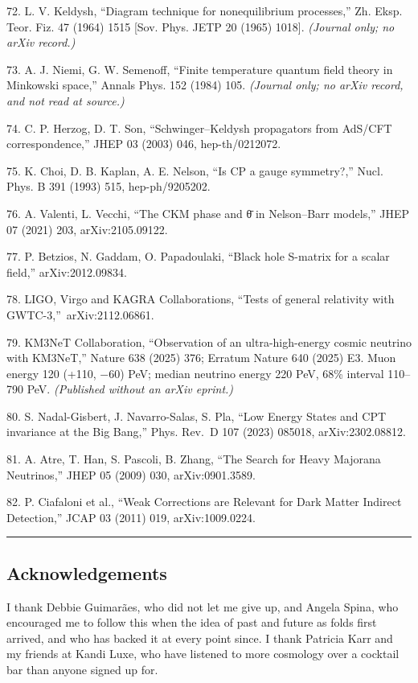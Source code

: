 \documentclass[
]{article}
\newcounter{none} %
\begin{document}
72. L. V. Keldysh, ``Diagram technique for nonequilibrium processes,''
Zh. Eksp. Teor. Fiz. 47 (1964) 1515 {[}Sov. Phys. JETP 20 (1965)
1018{]}. \emph{(Journal only; no arXiv record.)}

73. A. J. Niemi, G. W. Semenoff, ``Finite temperature quantum field
theory in Minkowski space,'' Annals Phys. 152 (1984) 105. \emph{(Journal
only; no arXiv record, and not read at source.)}

74. C. P. Herzog, D. T. Son, ``Schwinger--Keldysh propagators from
AdS/CFT correspondence,'' JHEP 03 (2003) 046, hep-th/0212072.

75. K. Choi, D. B. Kaplan, A. E. Nelson, ``Is CP a gauge symmetry?,''
Nucl. Phys. B 391 (1993) 515, hep-ph/9205202.

76. A. Valenti, L. Vecchi, ``The CKM phase and θ̄ in Nelson--Barr
models,'' JHEP 07 (2021) 203, arXiv:2105.09122.

77. P. Betzios, N. Gaddam, O. Papadoulaki, ``Black hole S-matrix for a
scalar field,'' arXiv:2012.09834.

78. LIGO, Virgo and KAGRA Collaborations, ``Tests of general relativity
with GWTC-3,''~arXiv:2112.06861.

79. KM3NeT Collaboration, ``Observation of an ultra-high-energy cosmic
neutrino with KM3NeT,'' Nature 638 (2025) 376; Erratum Nature 640 (2025)
E3. Muon energy 120 (+110, −60) PeV; median neutrino energy 220 PeV,
68\% interval 110--790 PeV. \emph{(Published without an arXiv eprint.)}

80. S. Nadal-Gisbert, J. Navarro-Salas, S. Pla, ``Low Energy States and
CPT invariance at the Big Bang,'' Phys. Rev.~D 107 (2023) 085018,
arXiv:2302.08812.

81. A. Atre, T. Han, S. Pascoli, B. Zhang, ``The Search for Heavy
Majorana Neutrinos,'' JHEP 05 (2009) 030, arXiv:0901.3589.

82. P. Ciafaloni et al., ``Weak Corrections are Relevant for Dark Matter
Indirect Detection,'' JCAP 03 (2011) 019, arXiv:1009.0224.

\begin{center}\rule{0.5\linewidth}{0.5pt}\end{center}

\clearpage

\subsection{Acknowledgements}\label{acknowledgements}

I thank Debbie Guimarães, who did not let me give up, and Angela Spina,
who encouraged me to follow this when the idea of past and future as
folds first arrived, and who has backed it at every point since. I thank
Patricia Karr and my friends at Kandi Luxe, who have listened to more
cosmology over a cocktail bar than anyone signed up for.
\end{document}
